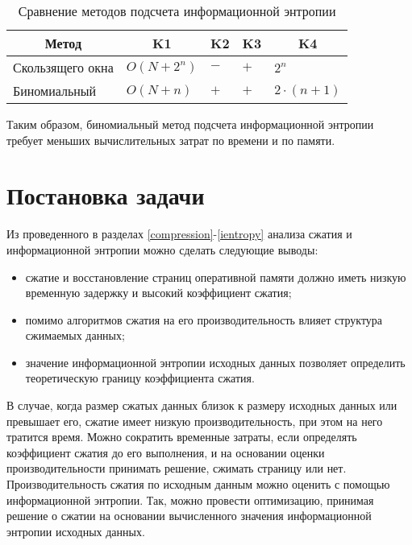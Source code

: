 \begin{table}[h]
    \caption{Сравнение методов подсчета информационной энтропии}
    \begin{center}
        \begin{tabular}{|l|l|l|l|l|}
        		\hline
            \multicolumn{1}{|c}{\textbf{Метод}} & 
            \multicolumn{1}{|c|}{\textbf{K1}} &
            \multicolumn{1}{c|}{\textbf{K2}} &
            \multicolumn{1}{c|}{\textbf{K3}} & 
            \multicolumn{1}{c|}{\textbf{K4}} \\ \hline
            Скользящего окна &  $O(N + 2^n)$ & $-$ & $+$ & $2^n$ \\ \hline
            Биномиальный &  $O(N + n)$ & $+$ & $+$ & $2 \cdot (n + 1)$ \\ \hline
        \end{tabular}
    \end{center}
    \label{tab:comparison}
\end{table}

Таким образом, биномиальный метод подсчета информационной энтропии требует меньших вычислительных затрат по времени и по памяти.

\section{Постановка задачи}

Из проведенного в разделах \ref{compression}-\ref{ientropy} анализа сжатия и информационной энтропии можно сделать следующие выводы:

\begin{itemize}
	\item сжатие и восстановление страниц оперативной памяти должно иметь низкую временную задержку и высокий коэффициент сжатия;
	\item помимо алгоритмов сжатия на его производительность влияет структура сжимаемых данных;
	\item значение информационной энтропии исходных данных позволяет определить теоретическую границу коэффициента сжатия.
\end{itemize}

В случае, когда размер сжатых данных близок к размеру исходных данных или превышает его, сжатие имеет низкую производительность, при этом на него тратится время. Можно сократить временные затраты, если определять коэффициент сжатия до его выполнения, и на основании оценки производительности принимать решение, сжимать страницу или нет. Производительность сжатия по исходным данным можно оценить с помощью информационной энтропии. Так, можно провести оптимизацию, принимая решение о сжатии на основании вычисленного значения информационной энтропии исходных данных.

